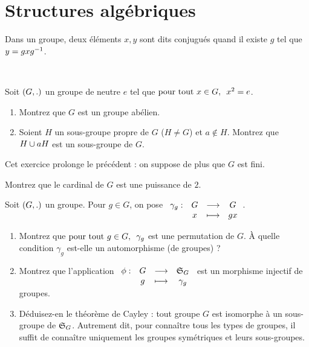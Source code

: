 \chapter{Structures algébriques}

\minitoc

\legendeexercices

Dans un groupe, deux éléments \(x,y\) sont dits conjugués quand il existe \(g\) tel que \(y=gxg\inv\).

~\\

\begin{exos}
Soit \(\groupe{G}[.]\) un groupe de neutre \(e\) tel que \(\quantifs{\tpt x\in G}x^2=e\).

\begin{enumerate}
    \item Montrez que \(G\) est un groupe abélien. \\
    \item Soient \(H\) un sous-groupe propre de \(G\) (\ie \(H\not=G\)) et \(a\not\in H\). Montrez que \(H\union aH\) est un sous-groupe de \(G\).
\end{enumerate}
\end{exos}

\begin{exoss}
Cet exercice prolonge le précédent : on suppose de plus que \(G\) est fini.

Montrez que le cardinal de \(G\) est une puissance de \(2\).
\end{exoss}

\begin{exoss}
Soit \(\groupe{G}[.]\) un groupe. Pour \(g\in G\), on pose \(\fonction{\gamma_g}{G}{G}{x}{gx}\).

\begin{enumerate}
    \item Montrez que \(\quantifs{\tpt g\in G}\gamma_g\) est une permutation de \(G\). À quelle condition \(\gamma_g\) est-elle un automorphisme (de groupes) ? \\
    \item Montrez que l'application \(\fonction{\phi}{G}{\S{G}}{g}{\gamma_g}\) est un morphisme injectif de groupes. \\
    \item Déduisez-en le théorème de Cayley : tout groupe \(G\) est isomorphe à un sous-groupe de \(\S{G}\). Autrement dit, pour connaître tous les types de groupes, il suffit de connaître uniquement les groupes symétriques et leurs sous-groupes.
\end{enumerate}
\end{exoss}

